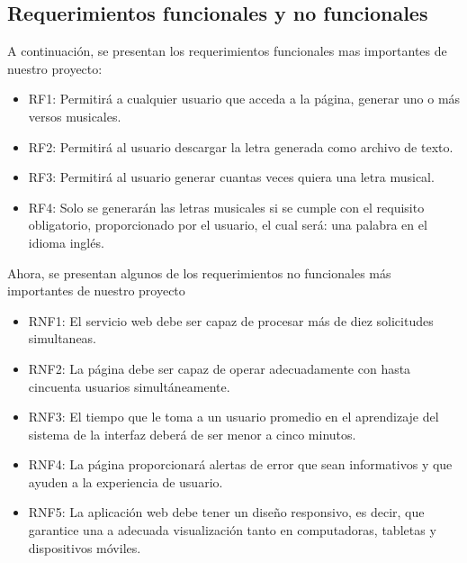 \documentclass[12pt, a4paper, titlepage]{report}
\begin{document}
		\subsection{Requerimientos funcionales y no funcionales}
		A continuación, se presentan los requerimientos funcionales mas importantes de nuestro proyecto:
		\begin{itemize}
			\item RF1: Permitirá a cualquier usuario que acceda a la página, generar uno o más versos musicales.
			\item RF2: Permitirá al usuario descargar la letra generada como archivo de texto.
			\item RF3: Permitirá al usuario generar cuantas veces quiera una letra musical.
			\item RF4: Solo se generarán las letras musicales si se cumple con el requisito obligatorio, proporcionado por el usuario, el cual será: una palabra en el idioma inglés.
		\end{itemize}
		Ahora, se presentan algunos de los requerimientos no funcionales más importantes de nuestro proyecto
		\begin{itemize}
			\item RNF1: El servicio web debe ser capaz de procesar más de diez solicitudes simultaneas.
			\item RNF2: La página debe ser capaz de operar adecuadamente con hasta cincuenta usuarios simultáneamente.
			\item RNF3: El tiempo que le toma a un usuario promedio en el aprendizaje del sistema de la interfaz deberá de ser menor a cinco minutos.
			\item RNF4: La página proporcionará alertas de error que sean informativos y que ayuden a la experiencia de usuario.
			\item RNF5: La aplicación web debe tener un diseño responsivo, es decir, que garantice una a adecuada visualización tanto en computadoras, tabletas y dispositivos móviles.
		\end{itemize}
	\newpage
\end{document}

